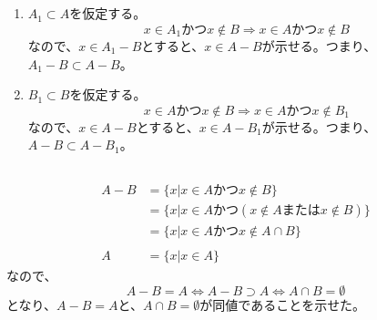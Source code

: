 \documentclass{jsarticle}
\begin{document}
\subsection{}
\begin{enumerate}
\item
$A_1 \subset A$を仮定する。
\[x \in A_1 かつ x\notin B \Longrightarrow x\in A かつ x\notin B\]
なので、$x\in A_1-B$とすると、$x\in A-B$が示せる。つまり、$A_1-B \subset A-B$。
\item
$B_1 \subset B$を仮定する。
\[x \in A かつ x\notin B \Longrightarrow x\in A かつ x\notin B_1\]
なので、$x\in A-B$とすると、$x\in A-B_1$が示せる。つまり、$A-B \subset A-B_1$。
\end{enumerate}

\subsection{}
\begin{align*}
A-B&=\{x|x\in A かつ x\notin B\}\\
&=\{x|x\in A かつ (x\notin A または x\notin B)\}\\
&=\{x|x\in A かつ x\notin A\cap B\}\\\\
A&=\{x|x\in A\}
\end{align*}
なので、
\[A-B=A \Longleftrightarrow  A-B \supset A \Longleftrightarrow A\cap B = \emptyset\]
となり、$A-B=A$と、$A\cap B=\emptyset$が同値であることを示せた。
\end{document}
